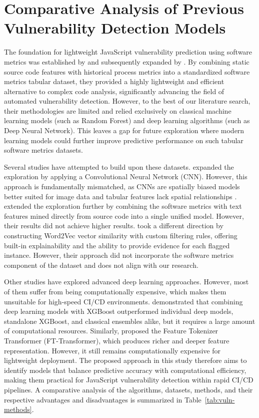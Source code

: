 \section{Comparative Analysis of Previous Vulnerability Detection Models}

The foundation for lightweight JavaScript vulnerability prediction using software metrics was established by \citet{ferenc_challenging_2019} and subsequently expanded by \citet{viszkok_improving_2021}. By combining static source code features with historical process metrics into a standardized software metrics tabular dataset, they provided a highly lightweight and efficient alternative to complex code analysis, significantly advancing the field of automated vulnerability detection. However, to the best of our literature search, their methodologies are limited and relied exclusively on classical machine learning models (such as Random Forest) and deep learning algorithms (such as Deep Neural Network). This leaves a gap for future exploration where modern learning models could further improve predictive performance on such tabular software metrics datasets.

Several studies have attempted to build upon these datasets. \citet{sheneamer_vulnerable_2024} expanded the exploration by applying a Convolutional Neural Network (CNN). However, this approach is fundamentally mismatched, as CNNs are spatially biased models better suited for image data and tabular features lack spatial relationships \citep{ingrosso_data-driven_2022}. \citet{kalouptsoglou_examining_2022} extended the exploration further by combining the software metrics with text features mined directly from source code into a single unified model. However, their results did not achieve higher results. \citet{mosolygo_towards_2021} took a different direction by constructing Word2Vec vector similarity with custom filtering rules, offering built-in explainability and the ability to provide evidence for each flagged instance. However, their approach did not incorporate the software metrics component of the dataset and does not align with our research.

Other studies have explored advanced deep learning approaches. However, most of them suffer from being computationally expensive, which makes them unsuitable for high-speed CI/CD environments. \citet{shwartz-ziv_tabular_2022} demonstrated that combining deep learning models with XGBoost outperformed individual deep models, standalone XGBoost, and classical ensembles alike, but it requires a large amount of computational resources. Similarly, \citet{gorishniy_revisiting_2023} proposed the Feature Tokenizer Transformer (FT-Transformer), which produces richer and deeper feature representation. However, it still remains computationally expensive for lightweight deployment. The proposed approach in this study therefore aims to identify models that balance predictive accuracy with computational efficiency, making them practical for JavaScript vulnerability detection within rapid CI/CD pipelines. A comparative analysis of the algorithms, datasets, methods, and their respective advantages and disadvantages is summarized in Table~\ref{tab:vuln-methods}.

